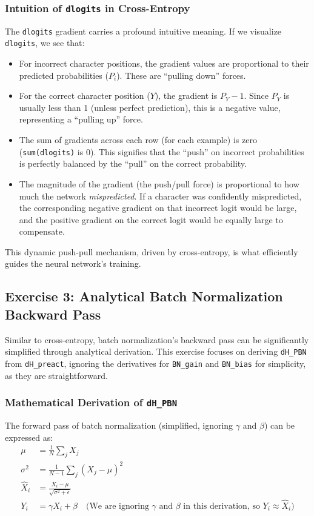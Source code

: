 \subsubsection{Intuition of \texttt{dlogits} in Cross-Entropy}
The \texttt{dlogits} gradient carries a profound intuitive meaning. If we visualize \texttt{dlogits}, we see that:
\begin{itemize}
    \item For incorrect character positions, the gradient values are proportional to their predicted probabilities ($P_i$). These are ``pulling down'' forces.
    \item For the correct character position ($Y$), the gradient is $P_Y - 1$. Since $P_Y$ is usually less than 1 (unless perfect prediction), this is a negative value, representing a ``pulling up'' force.
    \item The sum of gradients across each row (for each example) is zero (\texttt{sum(dlogits)} is 0). This signifies that the ``push'' on incorrect probabilities is perfectly balanced by the ``pull'' on the correct probability.
    \item The magnitude of the gradient (the push/pull force) is proportional to how much the network \textit{mispredicted}. If a character was confidently mispredicted, the corresponding negative gradient on that incorrect logit would be large, and the positive gradient on the correct logit would be equally large to compensate.
\end{itemize}
This dynamic push-pull mechanism, driven by cross-entropy, is what efficiently guides the neural network's training.

\subsection{Exercise 3: Analytical Batch Normalization Backward Pass}

Similar to cross-entropy, batch normalization's backward pass can be significantly simplified through analytical derivation. This exercise focuses on deriving \texttt{dH\_PBN} from \texttt{dH\_preact}, ignoring the derivatives for \texttt{BN\_gain} and \texttt{BN\_bias} for simplicity, as they are straightforward.

\subsubsection{Mathematical Derivation of \texttt{dH\_PBN}}
The forward pass of batch normalization (simplified, ignoring $\gamma$ and $\beta$) can be expressed as:
\begin{align}
\mu &= \frac{1}{N} \sum_j X_j \\
\sigma^2 &= \frac{1}{N-1} \sum_j (X_j - \mu)^2 \\
\hat{X}_i &= \frac{X_i - \mu}{\sqrt{\sigma^2 + \epsilon}} \\
Y_i &= \gamma \hat{X}_i + \beta \quad \text{(We are ignoring } \gamma \text{ and } \beta \text{ in this derivation, so } Y_i \approx \hat{X}_i\text{)}
\end{align}

